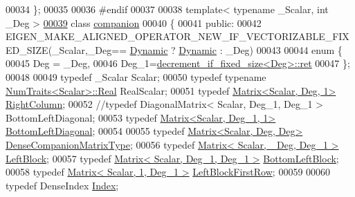 \begin{DoxyCode}
00034 \};
00035 
00036 \textcolor{preprocessor}{#endif}
00037 
00038 \textcolor{keyword}{template}< \textcolor{keyword}{typename} \_Scalar, \textcolor{keywordtype}{int} \_Deg >
\hyperlink{class_eigen_1_1internal_1_1companion}{00039} \textcolor{keyword}{class }\hyperlink{class_eigen_1_1internal_1_1companion}{companion}
00040 \{
00041   \textcolor{keyword}{public}:
00042     EIGEN\_MAKE\_ALIGNED\_OPERATOR\_NEW\_IF\_VECTORIZABLE\_FIXED\_SIZE(\_Scalar,\_Deg==
      \hyperlink{namespace_eigen_ad81fa7195215a0ce30017dfac309f0b2}{Dynamic} ? \hyperlink{namespace_eigen_ad81fa7195215a0ce30017dfac309f0b2}{Dynamic} : \_Deg)
00043 
00044     \textcolor{keyword}{enum} \{
00045       Deg = \_Deg,
00046       Deg\_1=\hyperlink{struct_eigen_1_1internal_1_1decrement__if__fixed__size}{decrement\_if\_fixed\_size<Deg>::ret}
00047     \};
00048 
00049     \textcolor{keyword}{typedef} \_Scalar                                Scalar;
00050     \textcolor{keyword}{typedef} \textcolor{keyword}{typename} \hyperlink{group___core___module_struct_eigen_1_1_num_traits}{NumTraits<Scalar>::Real}       RealScalar;
00051     \textcolor{keyword}{typedef} \hyperlink{group___core___module}{Matrix<Scalar, Deg, 1>}                 
      \hyperlink{group___core___module}{RightColumn};
00052     \textcolor{comment}{//typedef DiagonalMatrix< Scalar, Deg\_1, Deg\_1 > BottomLeftDiagonal;}
00053     \textcolor{keyword}{typedef} \hyperlink{group___core___module}{Matrix<Scalar, Deg\_1, 1>}               
      \hyperlink{group___core___module}{BottomLeftDiagonal};
00054 
00055     \textcolor{keyword}{typedef} \hyperlink{group___core___module_class_eigen_1_1_matrix}{Matrix<Scalar, Deg, Deg>}               
      \hyperlink{group___core___module_class_eigen_1_1_matrix}{DenseCompanionMatrixType};
00056     \textcolor{keyword}{typedef} \hyperlink{group___core___module_class_eigen_1_1_matrix}{Matrix< Scalar, \_Deg, Deg\_1 >}          
      \hyperlink{group___core___module_class_eigen_1_1_matrix}{LeftBlock};
00057     \textcolor{keyword}{typedef} \hyperlink{group___core___module_class_eigen_1_1_matrix}{Matrix< Scalar, Deg\_1, Deg\_1 >}         
      \hyperlink{group___core___module_class_eigen_1_1_matrix}{BottomLeftBlock};
00058     \textcolor{keyword}{typedef} \hyperlink{group___core___module_class_eigen_1_1_matrix}{Matrix< Scalar, 1, Deg\_1 >}             
      \hyperlink{group___core___module_class_eigen_1_1_matrix}{LeftBlockFirstRow};
00059 
00060     \textcolor{keyword}{typedef} DenseIndex \hyperlink{namespace_eigen_a62e77e0933482dafde8fe197d9a2cfde}{Index};

\end{DoxyCode}
